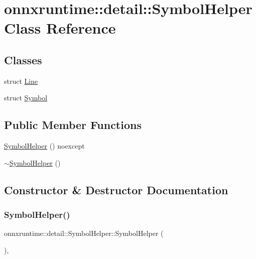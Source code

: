 \hypertarget{classonnxruntime_1_1detail_1_1SymbolHelper}{}\section{onnxruntime\+:\+:detail\+:\+:Symbol\+Helper Class Reference}
\label{classonnxruntime_1_1detail_1_1SymbolHelper}
\subsection*{Classes}
\begin{DoxyCompactItemize}
\item 
struct \mbox{\hyperlink{structonnxruntime_1_1detail_1_1SymbolHelper_1_1Line}{Line}}
\item 
struct \mbox{\hyperlink{structonnxruntime_1_1detail_1_1SymbolHelper_1_1Symbol}{Symbol}}
\end{DoxyCompactItemize}
\subsection*{Public Member Functions}
\begin{DoxyCompactItemize}
\item 
\mbox{\hyperlink{classonnxruntime_1_1detail_1_1SymbolHelper_a6dbf66f73dfed8da1258894cb87f8a44}{Symbol\+Helper}} () noexcept
\item 
\mbox{\hyperlink{classonnxruntime_1_1detail_1_1SymbolHelper_ab89c81ca228e97f3dd823f7e47fc5159}{$\sim$\+Symbol\+Helper}} ()
\end{DoxyCompactItemize}


\subsection{Constructor \& Destructor Documentation}
\mbox{\label{classonnxruntime_1_1detail_1_1SymbolHelper_a6dbf66f73dfed8da1258894cb87f8a44}} 
\subsubsection{\texorpdfstring{Symbol\+Helper()}{SymbolHelper()}}
{\footnotesize\ttfamily onnxruntime\+::detail\+::\+Symbol\+Helper\+::\+Symbol\+Helper (\begin{DoxyParamCaption}{ }\end{DoxyParamCaption})\hspace{0.3cm}{\ttfamily [inline]}, {\ttfamily [noexcept]}}

